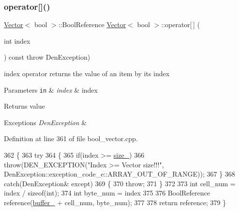 \subsubsection{\texorpdfstring{operator[]()}{operator[]()}}
{\footnotesize\ttfamily \hyperlink{classVector}{Vector}$<$ bool $>$\+::Bool\+Reference \hyperlink{classVector}{Vector}$<$ bool $>$\+::operator\mbox{[}$\,$\mbox{]} (\begin{DoxyParamCaption}\item[{int}]{index }\end{DoxyParamCaption}) const throw  Den\+Exception) }



index operator  returns the value of an item by its index 


\begin{DoxyParams}[1]{Parameters}
\mbox{\tt in}  & {\em index} & index \\
\hline
\end{DoxyParams}
\begin{DoxyReturn}{Returns}
value 
\end{DoxyReturn}

\begin{DoxyExceptions}{Exceptions}
{\em Den\+Exception} & \\
\hline
\end{DoxyExceptions}


Definition at line 361 of file bool\+\_\+vector.\+cpp.


\begin{DoxyCode}
362     \{
363         \textcolor{keywordflow}{try}
364             \{
365                 \textcolor{keywordflow}{if}(index >= \hyperlink{classVector_3_01bool_01_4_a07895adb41b2c819f85640e35c0d4ae0}{size\_})
366                     \textcolor{keywordflow}{throw}(DEN\_EXCEPTION(\textcolor{stringliteral}{"Index >= Vector size!!!"}, 
      DenException::exception\_code\_e::ARRAY\_OUT\_OF\_RANGE));
367             \}
368         \textcolor{keywordflow}{catch}(DenException& except)
369             \{
370                 \textcolor{keywordflow}{throw};
371             \}
372 
373         \textcolor{keywordtype}{int} cell\_num = index / \textcolor{keyword}{sizeof}(int);
374         \textcolor{keywordtype}{int} byte\_num = index %
375 
376         BoolReference reference(\hyperlink{classVector_3_01bool_01_4_ae2183c11de877eb13209c6a5a593604f}{buffer\_} + cell\_num, byte\_num);
377 
378         \textcolor{keywordflow}{return} reference;
379     \}
\end{DoxyCode}
\mbox{\label{classVector_3_01bool_01_4_a1cdf4ddfa0fe85a75b0a32767d969814}} 
